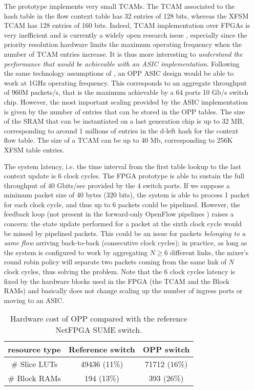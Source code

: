 \documentclass{sig-alternate}
\begin{document}
The prototype implements very small TCAMs. The TCAM associated to the hash table in the flow context table has 32 entries of 128 bits, whereas the XFSM TCAM has 128 entries of 160 bits. Indeed, TCAM implementation over FPGAs is very inefficient and is currently a widely open research issue \cite{TCAM1,TCAM2,TCAM4}, especially since the priority resolution hardware limits the maximum operating frequency when the number of TCAM entries increase. It is thus more interesting to {\em understand the performance that would be achievable with an ASIC implementation}. Following the same technology assumptions of \cite{Bos13}, an OPP ASIC design would be able to work at 1GHz operating frequency. This corresponds to an aggregate throughput of 960M packets/s, that is the maximum achievable by a 64 ports 10 Gb/s switch chip. However, the most important scaling provided by the ASIC implementation is given by the number of entries that can be stored in the OPP tables. The size of the SRAM that can be instantiated on a last generation chip is up to 32 MB, corresponding to around 1 millions of entries in the d-left hash for the context flow table. The size of a TCAM can be up to 40 Mb, corresponding to 256K XFSM table entries.

The system latency, i.e. the time interval from the first table lookup to the last context update is 6 clock cycles. The FPGA prototype is able to sustain the full throughput of 40 Gbits/sec provided by the 4 switch ports. If we suppose a minimum packet size of 40 bytes (320 bits), the system is able to process 1 packet for each clock cycle, and thus up to 6 packets could be pipelined. However, the feedback loop (not present in the forward-only OpenFlow pipelines \cite{OF1.4}) raises a concern: the state update performed for a packet at the sixth clock cycle would be missed by pipelined packets. This could be an issue for packets {\em belonging to a same flow} arriving back-to-back (consecutive clock cycles); in practice, as long as the system is configured to work by aggregating $N \geq 6$ different links, the mixer's round robin policy will separate two packets coming from the same link of $N$ clock cycles, thus solving the problem. Note that the 6 clock cycles latency is fixed by the hardware blocks used in the FPGA (the TCAM and the Block RAMs) and basically does not change scaling up the number of ingress ports or moving to an ASIC.

\begin{table}[t]
\centering
\small 
\begin{tabular}{|c|c|c|}
  \hline
resource type & Reference switch & OPP switch   \\
\hline
\# Slice LUTs & 49436 (11\%) & 71712 (16\%)  \\
 \hline
\# Block RAMs & 194  (13\%)  & 393 (26\%) \\
  \hline
\end{tabular}
      	  \vspace{-0.6em}
\caption{Hardware cost of OPP compared with the reference NetFPGA SUME switch.}
      	  \vspace{-1.5em}
\label{t:synth}
\end{table}
\end{document}
